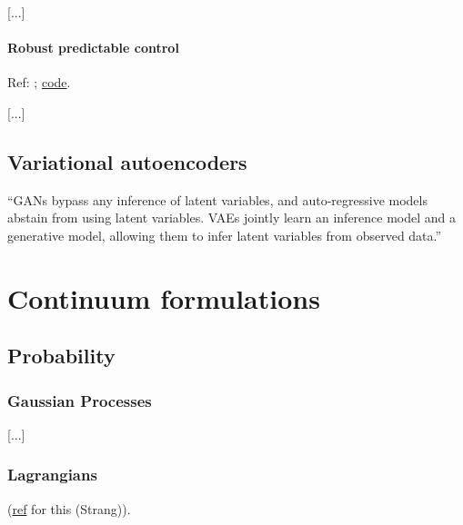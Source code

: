 \documentclass[notitlepage,openany,11pt]{report}
\theoremstyle{plain}%
\numberwithin{equation}{section}
\begin{document}
[...]


\subsubsection{Robust predictable control}
Ref: \cite{EysenbachEtAl:21a}; \href{https://ben-eysenbach.github.io/rpc/}{code}.

[...]


\section{Variational autoencoders}

``GANs bypass any inference of latent variables, and auto-regressive models abstain from using latent variables. VAEs jointly learn an inference model and a generative model, allowing them to infer latent variables from observed data.''





\chapter{Continuum formulations}

\section{Probability}


\subsection{Gaussian Processes}

[...]


\subsection{Lagrangians}
(\href{http://math.mit.edu/classes/18.086/2006/am72.pdf}{ref} for this (Strang)). 
\end{document}

